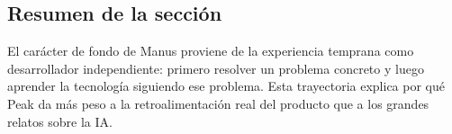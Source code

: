 \subsection{Resumen de la sección}

El carácter de fondo de Manus proviene de la experiencia temprana como desarrollador independiente: primero resolver un problema concreto y luego aprender la tecnología siguiendo ese problema. Esta trayectoria explica por qué Peak da más peso a la retroalimentación real del producto que a los grandes relatos sobre la IA.

